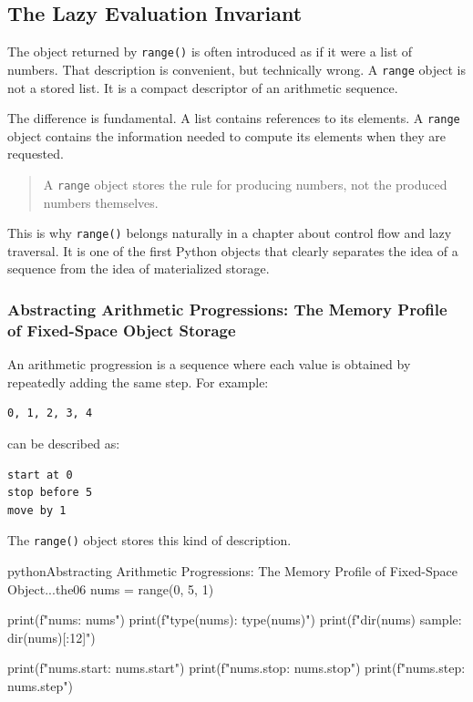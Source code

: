 \subsection{The Lazy Evaluation Invariant}

The object returned by \texttt{range()} is often introduced as if it were a list of numbers. That description is convenient, but technically wrong. A \texttt{range} object is not a stored list. It is a compact descriptor of an arithmetic sequence.

The difference is fundamental. A list contains references to its elements. A \texttt{range} object contains the information needed to compute its elements when they are requested.

\begin{quote}
A \texttt{range} object stores the rule for producing numbers, not the produced numbers themselves.
\end{quote}

This is why \texttt{range()} belongs naturally in a chapter about control flow and lazy traversal. It is one of the first Python objects that clearly separates the idea of a sequence from the idea of materialized storage.

\subsubsection{Abstracting Arithmetic Progressions: The Memory Profile of Fixed-Space Object Storage}

An arithmetic progression is a sequence where each value is obtained by repeatedly adding the same step. For example:

\begin{verbatim}
0, 1, 2, 3, 4
\end{verbatim}

can be described as:

\begin{verbatim}
start at 0
stop before 5
move by 1
\end{verbatim}

The \texttt{range()} object stores this kind of description.

\begin{codebox}[]{python}{Abstracting Arithmetic Progressions: The Memory Profile of Fixed-Space Object...}{the06}
nums = range(0, 5, 1)

print(f"nums: {nums}")
print(f"type(nums): {type(nums)}")
print(f"dir(nums) sample: {dir(nums)[:12]}")

print(f"nums.start: {nums.start}")
print(f"nums.stop: {nums.stop}")
print(f"nums.step: {nums.step}")
\end{codebox}


